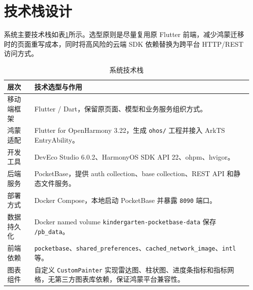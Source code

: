 \section{技术栈设计}

系统主要技术栈如表\ref{tab:tech-stack}所示。选型原则是尽量复用原 Flutter 前端，减少鸿蒙迁移时的页面重写成本，同时将高风险的云端 SDK 依赖替换为跨平台 HTTP/REST 访问方式。

\begin{table}[htbp]
    \centering
    \caption{系统技术栈}
    \label{tab:tech-stack}
    \begin{tabularx}{0.95\textwidth}{l>{\RaggedRight\arraybackslash}X}
        \toprule
        \textbf{层次} & \textbf{技术选型与作用}                                                                                                                             \\
        \midrule
        移动端框架       & Flutter / Dart，保留原页面、模型和业务服务组织方式。                                                                                                            \\
        鸿蒙适配        & Flutter for OpenHarmony 3.22，生成 \texttt{ohos/} 工程并接入 ArkTS EntryAbility\cite{openharmony_package_structure_stage,openharmony_module_config}。 \\
        开发工具        & DevEco Studio 6.0.2、HarmonyOS SDK API 22、ohpm、hvigor\cite{openharmony_hap_package}。                                                          \\
        后端服务        & PocketBase，提供 auth collection、base collection、REST API 和静态文件服务\cite{pocketbase_collections,pocketbase_authentication}。                       \\
        部署方式        & Docker Compose，本地启动 PocketBase 并暴露 \texttt{8090} 端口\cite{docker_compose_overview}。                                                           \\
        数据持久化       & Docker named volume \texttt{kindergarten-pocketbase-data} 保存 \texttt{/pb\_data}\cite{docker_compose_volumes}。                                \\
        前端依赖        & \texttt{pocketbase}、\texttt{shared\_preferences}、\texttt{cached\_network\_image}、\texttt{intl} 等。                                            \\
        图表组件        & 自定义 \texttt{CustomPainter} 实现雷达图、柱状图、进度条指标和指标网格，无第三方图表库依赖，保证鸿蒙平台兼容性。                                                                         \\
        \bottomrule
    \end{tabularx}
\end{table}

